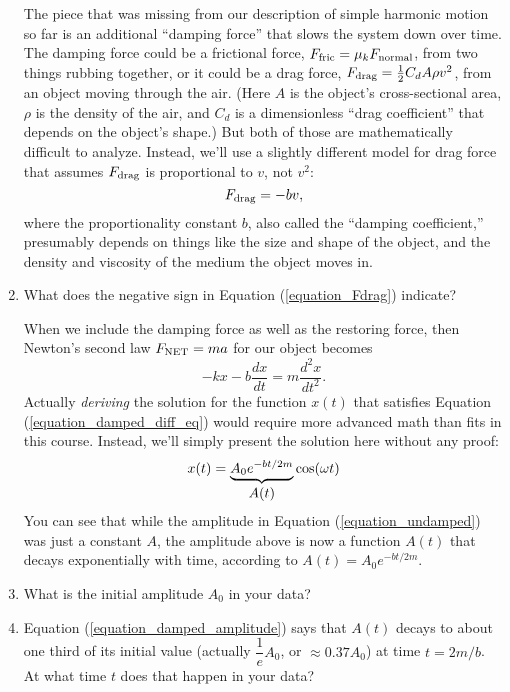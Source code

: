 \begin{enumerate}[labparts]
The piece that was missing from our description of simple harmonic motion so far is an additional ``damping force'' that slows the system down over time.  The damping force could be a frictional force, $F_{\rm fric}=\mu_k F_{\rm normal}$,  from two things rubbing together, or it could be a drag force, $F_{\rm drag} = \frac{1}{2}C_d A \rho v^2$, from an object moving through the air.  
(Here $A$ is the object's cross-sectional area, $\rho$ is the density of the air, and $C_d$ is a dimensionless ``drag coefficient'' that depends on the object's shape.)
But both of those are mathematically difficult to analyze.  Instead, we'll use a slightly different model for drag force that assumes $F_{\rm drag}$ is proportional to $v$, not $v^2$:
\begin{equation}
F_{\rm drag}=-bv,
\label{equation_Fdrag}
\end{equation}
where the proportionality constant $b$, also called the ``damping coefficient,'' presumably depends on things like the size and shape of the object, and the density and viscosity of the medium the object moves in.

\item What does the negative sign in Equation (\ref{equation_Fdrag}) indicate?
\answerspace{0.6in}

When we include the damping force as well as the restoring force, then Newton's second law $F_{\rm NET} = ma$ for our object becomes
\begin{equation}
-kx-b\frac{dx}{dt}=m\frac{d^2x}{dt^2}.
\label{equation_damped_diff_eq}
\end{equation}
Actually \textit{deriving} the solution for the function $x(t)$ that satisfies Equation (\ref{equation_damped_diff_eq}) would require more advanced math than fits in this course.  Instead, we'll simply present the solution here without any proof:  
\begin{equation}
x(t)=\underbrace{A_0e^{-bt/2m}}_{%
\let\scriptstyle\textstyle 
\substack{A(t)}}
\cos(\omega t)
\label{equation_damped_amplitude}
\end{equation}
You can see that while the amplitude in Equation (\ref{equation_undamped}) was just a constant $A$, the amplitude above is now a function 
$A(t)$ that decays exponentially with time, according to $A(t) = A_0e^{-bt/2m}$.   

\item What is the initial amplitude $A_0$ in your data?
\answerspace{0.6in}

\item Equation (\ref{equation_damped_amplitude}) says that $A(t)$ decays to about one third of its initial value (actually $\dfrac{1}{e}A_0$, or $\approx 0.37A_0$) at time $t=2m/b$.  At what time $t$ does that happen in your data?
\answerspace{0.6in}


\end{enumerate}
